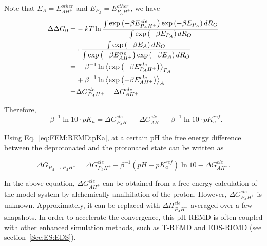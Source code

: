 Note that $E_{A}=E_{AH^{+}}^{other}$ and $E_{P_{A}}=E_{P_{A}H^{+}}^{other}$, we have
\begin{align}
	\Delta\Delta G_{0} = & -kT\ln\frac{\int\exp\left(-\beta E_{P_{A}H^{+}}^{ele}\right)\exp\left(-\beta E_{P_{A}}\right)dR_{O}}{\int\exp\left(-\beta E_{P_{A}}\right)dR_{O}}\\
	& \cdot \frac{\int\exp\left(-\beta E_{A}\right)dR_{O}}{\int\exp\left(-\beta E_{AH^{+}}^{ele}\right)\exp\left(-\beta E_{A}\right)dR_{O}}\\
	= & -\beta^{-1}\ln\left\langle \exp\left(-\beta E_{P_{A}H^{+}}^{ele}\right)\right\rangle _{P_{A}}\notag\\
	  &+\beta^{-1} \ln\left\langle \exp\left(-\beta E_{AH^{+}}^{ele}\right)\right\rangle _{A}\notag\\
	= & \Delta G_{P_{A}H^{+}}^{ele}-\Delta G_{AH^{+}}^{ele}  
\end{align}

Therefore,
\[
-\beta^{-1}\ln10\cdot pK_{a}=\Delta G_{P_{A}H^{+}}^{ele}-\Delta G_{AH^{+}}^{ele}-\beta^{-1}\ln10\cdot pK_{a}^{ref}.
\]

Using Eq.~\ref{eq:FEM:REMD:pKa}, at a certain pH the free energy difference between the deprotonated
and the protonated state can be written as

\[
\Delta G_{P_{A}\rightarrow P_{A}H^{+}}=\Delta G_{P_{A}H^{+}}^{ele}+\beta^{-1}(pH-pK_{a}^{ref})\ln10-\Delta G_{AH^{+}}^{ele}.
\]

In the above equation, $\Delta G_{AH^{+}}^{ele}$ can be obtained from a free energy calculation of the model system by alchemically annihilation of the proton. However, $\Delta G_{P_{A}H^{+}}^{ele}$ is unknown. Approximately, it can be replaced with $\Delta H_{P_{A}H^{+}}^{ele}$ averaged over a few snapshots.\cite{MengJCTC2010} In order to accelerate the convergence,
this pH-REMD is often coupled with other enhanced simulation methods, such as T-REMD\cite{MengJCTC2010} and EDS-REMD\cite{LeeJCTC2014} (see section~\ref{Sec:ES:EDS}).